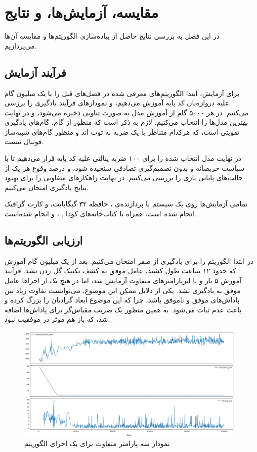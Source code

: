 \chapter{مقایسه، آزمایش‌ها، و نتایج}
در این فصل به بررسی نتایج حاصل از پیاده‌سازی الگوریتم‌ها و مقایسه آن‌ها می‌پردازیم.
\section{فرآیند آزمایش}
برای آزمایش، ابتدا الگوریتم‌های معرفی‌ شده در فصل‌های قبل را با یک میلیون گام علیه دروازه‌بان کد پایه 
آموزش می‌دهیم، و نمودار‌های فرآیند یادگیری را بررسی می‌کنیم. در هر ۵۰۰۰ گام از آموزش مدل به صورت تناوبی ذخیره می‌شود، و در نهایت بهترین مدل‌ها را انتخاب می‌کنیم.
لازم به ذکر است که منظور از گام، گام‌های یادگیری تقویتی است، که هرکدام متناظر با یک ضربه به توپ اند و منظور گام‌های شبیه‌ساز فوتبال نیست.

در نهایت مدل انتخاب شده را برای ۱۰۰ ضربه پنالتی علیه کد پایه قرار می‌دهیم تا با سیاست حریصانه و بدون تصمیم‌گیری تصادفی سنجیده شود، و درصد وقوع هر یک از حالت‌های پایانی بازی را بررسی می‌کنیم.
در نهایت راهکار‌های متفاوتی را برای بهبود نتایج یادگیری امتحان می‌کنیم.

تمامی آزمایش‌ها روی یک سیستم با پردازنده‌ی ، 
حافظه ۳۲ گیگابایت،
و کارت گرافیک  انجام شده است، 
همراه‌ با کتاب‌خانه‌های کودا 
, ، و 
انجام شده‌است.
\section{ارزیابی الگوریتم‌ها}
در ابتدا الگوریتم  را برای یادگیری از صفر امتحان می‌کنیم.
بعد از یک میلیون گام آموزش که حدود ۱۲ ساعت طول کشید، عامل موفق به کشف تکنیک گل زدن نشد.
فرآیند آموزش ۵ بار و با ابرپارامتر‌های متفاوت آزمایش شد، اما در هیچ یک از اجرا‌ها عامل موفق به یادگیری نشد.
یکی از دلایل ممکن این موضوع، می‌توانست تفاوت زیاد بین پاداش‌های موفق و ناموفق باشد، چرا که این موضوع ابعاد گرادیان را بزرگ کرده و باعث عدم ثبات می‌شود. به همین منظور یک ضریب مقیاس‌گر 
برای پاداش‌ها اضافه شد، که باز هم موثر در موفقیت نبود.

\begin{figure}[H]
    \centering
    \includegraphics[width=1\textwidth]{images/DQN_graphs.png}
    \caption{نمودار سه پارامتر متفاوت برای یک اجرای الگوریتم }\label{fig:dqn_graphs}
\end{figure}

